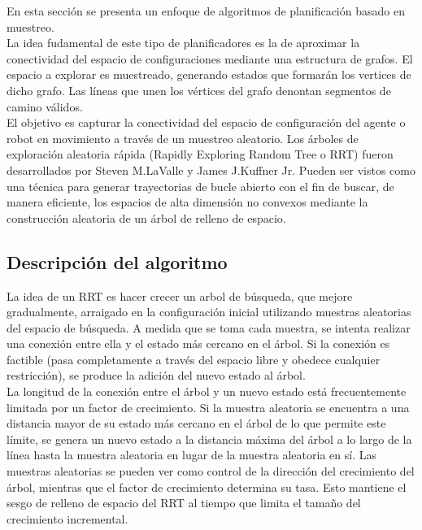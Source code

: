 \documentclass[conference]{IEEEtran}
\begin{document}
{En esta sección se presenta un enfoque de algoritmos de planificación basado en muestreo.\\
 
La idea fudamental de este tipo de planificadores es la de aproximar la conectividad del espacio de configuraciones mediante una estructura de grafos. El espacio a explorar es muestreado, generando estados que formarán los vertices de dicho grafo. Las líneas que unen los vértices del grafo denontan segmentos de camino válidos.\\
 
El objetivo es capturar la conectividad del espacio de configuración del agente o robot en movimiento a través de un muestreo aleatorio. 
Los árboles de exploración aleatoria rápida (Rapidly Exploring Random Tree o RRT) fueron desarrollados por Steven M.LaValle y James J.Kuffner Jr. Pueden ser vistos como una técnica para generar trayectorias de bucle abierto con el fin de buscar, de manera eficiente, los espacios de alta dimensión no convexos mediante la construcción aleatoria de un árbol de relleno de espacio.  

\subsection{Descripción del algoritmo}

La idea de un RRT es hacer crecer un arbol de búsqueda, que mejore gradualmente, arraigado en la configuración inicial utilizando muestras aleatorias del espacio de búsqueda. A medida que se toma cada muestra, se intenta realizar una conexión entre ella y el estado más cercano en el árbol. Si la conexión es factible (pasa completamente a través del espacio libre y obedece cualquier restricción), se produce la adición del nuevo estado al árbol. \\

La longitud de la conexión entre el árbol y un nuevo estado está frecuentemente limitada por un factor de crecimiento. Si la muestra aleatoria se encuentra a una distancia mayor de su estado más cercano en el árbol de lo que permite este límite, se genera un nuevo estado a la distancia máxima del árbol a lo largo de la línea hasta la muestra aleatoria en lugar de la muestra aleatoria en sí. Las muestras aleatorias se pueden ver como control de la dirección del crecimiento del árbol, mientras que el factor de crecimiento determina su tasa. Esto mantiene el sesgo de relleno de espacio del RRT al tiempo que limita el tamaño del crecimiento incremental.\\

}
\end{document}
